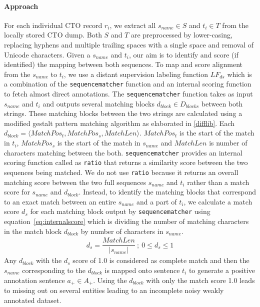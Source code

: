 \documentclass[11pt]{article}
\begin{document}
\paragraph{Approach}
For each individual CTO record $r_i$, we extract all $s_{name} \in S$ and $t_i \in T$ from the locally stored CTO dump.
Both $S$ and $T$ are preprocessed by lower-casing, replacing hyphens and multiple trailing spaces with a single space and removal of Unicode characters.
Given a $s_{name}$ and $t_i$, our aim is to identify and score (if identified) the mapping between both sequences.
To map and score alignment from the $s_{name}$ to $t_i$, we use a distant supervision labeling function $LF_{ds}$ which is a combination of the {\tt sequencematcher} function and an internal scoring function to fetch almost direct annotations.
The {\tt sequencematcher} function takes as input $s_{name}$ and $t_i$ and outputs several matching blocks $d_{block} \in D_{blocks}$ between both strings.
These matching blocks between the two strings are calculated using a modified gestalt pattern matching algorithm as elaborated in \ref{difflib}.
Each $d_{block} = \langle MatchPos_{t}, MatchPos_{s}, MatchLen \rangle $. 
$MatchPos_{t}$ is the start of the match in $t_i$, $MatchPos_{s}$ is the start of the match in $s_{name}$ and $MatchLen$ is number of characters matching between the both.
{\tt sequencematcher} provides an internal scoring function called as {\tt ratio} that returns a similarity score between the two sequences being matched.
We do not use {\tt ratio} because it returns an overall matching score between the two full sequences $s_{name}$ and $t_i$ rather than a match score for $s_{name}$ and $d_{block}$.
Instead, to identify the matching blocks that correspond to an exact match between an entire $s_{name}$ and a part of $t_i$, we calculate a match score $d_s$ for each matching block output by {\tt sequencematcher} using equation~\ref{eq:internalscore} which is dividing the number of matching characters in the match block $d_{block}$ by number of characters in $s_{name}$.
%
\begin{gather}
\label{eq:internalscore}
  d_s = \dfrac{ MatchLen }{ |s_{name}| } \: ; \: 0 \leq d_s \leq 1
\end{gather}
%
Any $d_{block}$ with the $d_s$ score of 1.0 is considered as complete match and then the $s_{name}$ corresponding to the $d_{block}$ is mapped onto sentence $t_i$ to generate a positive annotation sentence $a_{+} \in A_{+}$.
Using the $d_{block}$ with only the match score 1.0 leads to missing out on several entities leading to an incomplete noisy weakly annotated dataset.
\end{document}
